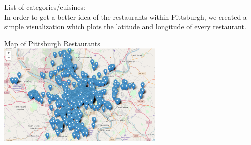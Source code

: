\documentclass{neu_handout}
\begin{document}
List of categories/cuisines: \\

In order to get a better idea of the restaurants within Pittsburgh, we created a simple visualization which plots the latitude and longitude of every restaurant.\\

\begin{center}
Map of Pittsburgh Restaurants \\
\includegraphics[width=80mm,scale=0.5]{PittsburghRestaurants}\\
\end{center}
\end{document}
